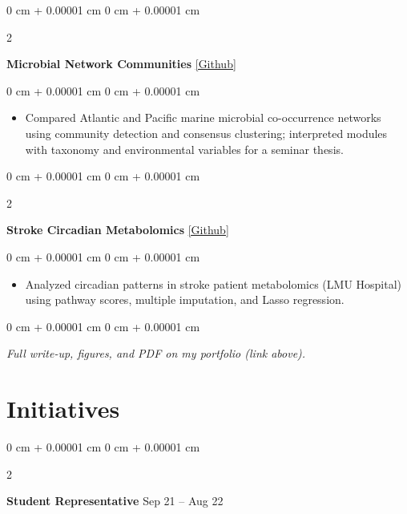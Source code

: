 \documentclass[10pt, letterpaper]{article}
\newenvironment{highlights}{
    \setlength{\leftmargini}{2em}
    \begin{itemize}[
        topsep=0.10 cm,
        parsep=0.10 cm,
        partopsep=0pt,
        itemsep=0pt,
        leftmargin=2em
    ]
}{
    \end{itemize}
} %
\newenvironment{onecolentry}{
    \begin{adjustwidth}{
        0 cm + 0.00001 cm
    }{
        0 cm + 0.00001 cm
    }
}{
    \end{adjustwidth}
} %
\newenvironment{twocolentry}[2][]{
    \onecolentry
    \def\secondColumn{#2}
    \setcolumnwidth{\fill, 4.5 cm}
    \begin{paracol}{2}
}{
    \switchcolumn \raggedleft \secondColumn
    \end{paracol}
    \endonecolentry
} %
\begin{document}
        \begin{twocolentry}{
            \href{https://github.com/maxifrei6/microbial-network-communities}{[Github]}
        }
            \textbf{Microbial Network Communities}\end{twocolentry}

        \vspace{0.05 cm}
        \begin{onecolentry}
            \begin{highlights}
                \item Compared Atlantic and Pacific marine microbial co-occurrence networks using community detection and consensus clustering; interpreted modules with taxonomy and environmental variables for a seminar thesis.
            \end{highlights}
        \end{onecolentry}

        \vspace{0.2 cm}

        \begin{twocolentry}{
            \href{https://github.com/maxifrei6/stroke-circadian}{[Github]}
        }
            \textbf{Stroke Circadian Metabolomics}\end{twocolentry}

        \vspace{0.05 cm}
        \begin{onecolentry}
            \begin{highlights}
                \item Analyzed circadian patterns in stroke patient metabolomics (LMU Hospital) using pathway scores, multiple imputation, and Lasso regression.
            \end{highlights}
        \end{onecolentry}

        \vspace{0.15 cm}
        \begin{onecolentry}
            \textit{Full write-up, figures, and PDF on my portfolio (link above).}
        \end{onecolentry}


 \section{Initiatives}



        
        \begin{twocolentry}{
        Sep 21 – Aug 22
        }
            \textbf{Student Representative}\end{twocolentry}
\end{document}
